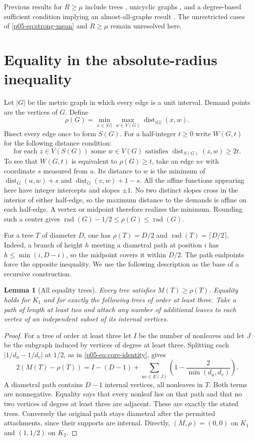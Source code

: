 \documentclass[11pt,a4paper]{article}
\newtheorem{lemma}[theorem]{Lemma}\newtheorem{corollary}[theorem]{Corollary}
\newcommand{\rad}{\operatorname{rad}}\newcommand{\diam}{\operatorname{diam}}
\newcommand{\dist}{\operatorname{dist}}\newcommand{\ecc}{\operatorname{ecc}}
\begin{document}
Previous results for $R\ge\mu$ include trees \cite{p05-CPSMean}, unicyclic
graphs \cite{p05-YL}, and a degree-based sufficient condition implying an
almost-all-graphs result \cite{p05-Dal}. The unrestricted cases of
\eqref{p05-eq:strong-mean} and $R\ge\mu$ remain unresolved here.

\section{Equality in the absolute-radius inequality}\label{p05-sec:equality}
Let $|G|$ be the metric graph in which every edge is a unit interval.
Demand points are the vertices of $G$. Define
\[
 \rho(G)=\min_{x\in|G|}\max_{w\in V(G)}\dist_{|G|}(x,w).
\]
Bisect every edge once to form $S(G)$. For a half-integer $t\ge0$ write
$W(G,t)$ for the following distance condition:
\[
 \text{for each }z\in V(S(G))\text{ some }w\in V(G)
       \text{ satisfies }\dist_{S(G)}(z,w)\ge 2t .
\]
To see that $W(G,t)$ is equivalent to $\rho(G)\ge t$, take an edge $uv$
with coordinate $s$ measured from $u$. Its distance to $w$ is the
minimum of $\dist_G(u,w)+s$ and $\dist_G(v,w)+1-s$. All the affine
functions appearing here have integer intercepts and slopes $\pm1$.
No two distinct slopes cross in the interior of either half-edge, so the
maximum distance to the demands is affine on each half-edge.
A vertex or midpoint therefore realizes the minimum. Rounding such a
center gives $\rad(G)-1/2\le\rho(G)\le\rad(G)$.

For a tree $T$ of diameter $D$, one has $\rho(T)=D/2$ and
$\rad(T)=\lceil D/2\rceil$. Indeed, a branch of height $h$ meeting a
diametral path at position $i$ has $h\le\min(i,D-i)$, so the midpoint
covers it within $D/2$. The path endpoints force the opposite inequality.
We use the following description as the base of a recursive construction.

\begin{lemma}[All equality trees]\label{p05-lem:eqtree}
Every tree satisfies $M(T)\ge\rho(T)$. Equality holds for $K_1$ and for
exactly the following trees of order at least three. Take a path of length
at least two and attach any number of additional leaves to each vertex of
an independent subset of its internal vertices.
\end{lemma}
\begin{proof}
For a tree of order at least three let $I$ be the number of nonleaves and
let $J$ be the subgraph induced by vertices of degree at least three.
Splitting each $|1/d_u-1/d_v|$ at $1/2$, as in
\eqref{p05-eq:core-identity}, gives
\[
 2(M(T)-\rho(T))=
 I-(D-1)+\sum_{uv\in E(J)}\left(1-\frac{2}{\min(d_u,d_v)}\right).
\]
A diametral path contains $D-1$ internal vertices, all nonleaves in $T$.
Both terms are nonnegative. Equality says that every nonleaf lies on
that path and that no two vertices of degree at least three are adjacent.
These are exactly the stated trees. Conversely the original path stays
diametral after the permitted attachments, since their supports are
internal. Directly, $(M,\rho)=(0,0)$ on $K_1$ and $(1,1/2)$ on $K_2$.
\end{proof}
\end{document}
